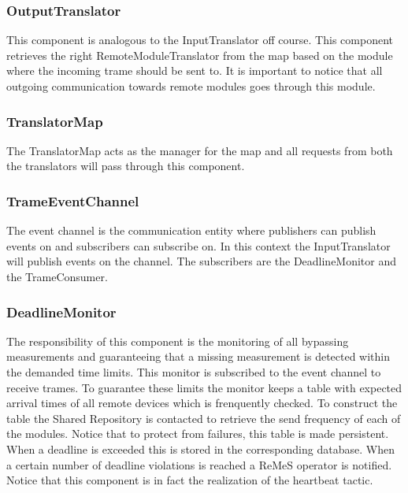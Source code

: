 \subsubsection{OutputTranslator}

\npar This component is analogous to the InputTranslator off course. This
component retrieves the right RemoteModuleTranslator from the map based on the
module where the incoming trame should be sent to. It is important to notice that all
outgoing communication towards remote modules goes through this module.

\subsubsection{TranslatorMap}

\npar The TranslatorMap acts as the manager for the map and all requests from
both the translators will pass through this component. 

\subsubsection{TrameEventChannel}

\npar The event channel is the communication entity where publishers can publish
events on and subscribers can subscribe on. In this context the InputTranslator
will publish events on the channel. The subscribers are the DeadlineMonitor and
the TrameConsumer.

\subsubsection{DeadlineMonitor}

\npar The responsibility of this component is the monitoring of all bypassing
measurements and guaranteeing that a missing measurement is detected within the
demanded time limits. This monitor is subscribed to the event channel to receive
trames. To guarantee these limits the monitor keeps a table with expected
arrival times of all remote devices which is frenquently checked. To construct
the table the Shared Repository is contacted to retrieve the send frequency of
each of the modules. Notice that to protect from failures, this table is made
persistent. When a deadline is exceeded this is stored in the corresponding
database. When a certain number of deadline violations is reached a ReMeS
operator is notified. Notice that this component is in fact the realization of
the heartbeat tactic.

